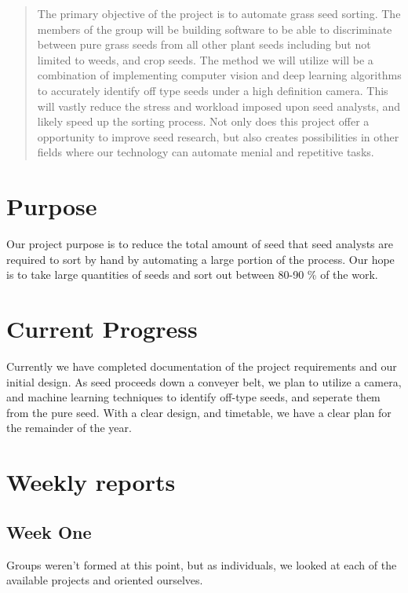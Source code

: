\documentclass[onecolumn, draftclsnofoot,10pt, compsoc]{IEEEtran}
\begin{document}
\begin{titlepage}
\begin{singlespace}
\begin{abstract}
        	The primary objective of the project is to automate grass seed sorting. The members of the group will be building software to be able to discriminate between pure grass seeds from all other plant seeds including but not limited to weeds, and crop seeds. The method we will utilize will be a combination of implementing computer vision and deep learning algorithms to accurately identify off type seeds under a high definition camera. This will vastly reduce the stress and workload imposed upon seed analysts, and likely speed up the sorting process. Not only does this project offer a opportunity to improve seed research, but also creates possibilities in other fields where our technology can automate menial and repetitive tasks.
        \end{abstract}     
    \end{singlespace}
\end{titlepage}
\newpage
{}
\tableofcontents
\clearpage

\section{Purpose}
Our project purpose is to reduce the total amount of seed that seed analysts are required to sort by hand by automating a large portion of the process. Our hope is to take large quantities of seeds and sort out between 80-90 \% of the work.

\section{Current Progress}

Currently we have completed documentation of the project requirements and our initial design. As seed proceeds down a conveyer belt, we plan to utilize a camera, and machine learning techniques to identify off-type seeds, and seperate them from the pure seed. With a clear design, and timetable, we have a clear plan for the remainder of the year. 

\section{Weekly reports}

\subsection{Week One}
Groups weren't formed at this point, but as individuals, we looked at each of the available projects and oriented ourselves.
\end{document}
